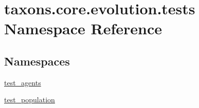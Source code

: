 \hypertarget{namespacetaxons_1_1core_1_1evolution_1_1tests}{}\section{taxons.\+core.\+evolution.\+tests Namespace Reference}
\label{namespacetaxons_1_1core_1_1evolution_1_1tests}
\subsection*{Namespaces}
\begin{DoxyCompactItemize}
\item 
 \hyperlink{namespacetaxons_1_1core_1_1evolution_1_1tests_1_1test__agents}{test\+\_\+agents}
\item 
 \hyperlink{namespacetaxons_1_1core_1_1evolution_1_1tests_1_1test__population}{test\+\_\+population}
\end{DoxyCompactItemize}
